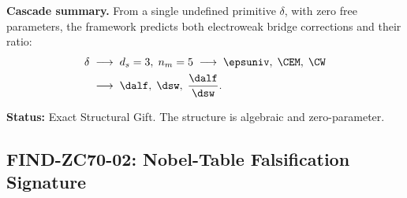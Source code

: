 \documentclass[12pt, a4paper]{article}
\begin{document}
\begin{giftbox}[title={FIND-ZC70-01: Three-Level Electroweak
  Structure Identity (Gift)}]
\textbf{Cascade summary.}
From a single undefined primitive $\delta$, with zero free
parameters, the framework predicts both electroweak bridge
corrections and their ratio:
\[
\begin{aligned}
  \delta
  &\;\longrightarrow\;
  d_s = 3,\; n_m = 5
  \;\longrightarrow\;
  \epsuniv,\; \CEM,\; \CW\\
  &\;\longrightarrow\;
  \dalf,\; \dsw,\; \frac{\dalf}{\dsw}.
\end{aligned}
\]

\textbf{Status:} Exact Structural Gift.
The structure is algebraic and zero-parameter.
\end{giftbox}

\subsection{FIND-ZC70-02: Nobel-Table Falsification Signature}
\label{sec:find02}
\end{document}
